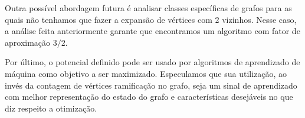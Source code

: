 \documentclass[conference]{IEEEtran}
\begin{document}
Outra poss\'ivel abordagem futura \'e analisar classes espec\'ificas de grafos para as quais n\~ao
tenhamos que fazer a expans\~ao de v\'ertices com 2 vizinhos. Nesse caso, a an\'alise feita
anteriormente garante que encontramos um algoritmo com fator de aproxima\c{c}\~ao $3/2$.

Por \'ultimo, o potencial definido pode ser usado por algoritmos de aprendizado de m\'aquina como
objetivo a ser maximizado. Especulamos que sua utiliza\c{c}\~ao, ao inv\'es da contagem de v\'ertices
ramifica\c{c}\~ao no grafo, seja um sinal de aprendizado com melhor representa\c{c}\~ao do estado do
grafo e caracter\'isticas desej\'aveis no que diz respeito a otimiza\c{c}\~ao.



\end{document}
